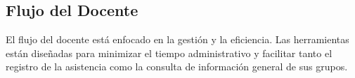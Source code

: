 \subsection{ Flujo del Docente}
\begin{samepage}\small
El flujo del docente está enfocado en la gestión y la eficiencia. Las herramientas están diseñadas para minimizar el tiempo administrativo y facilitar tanto el registro de la asistencia como la consulta de información general de sus grupos.
\begin{figure}[H]
	\centering

\end{figure}
\end{samepage}

